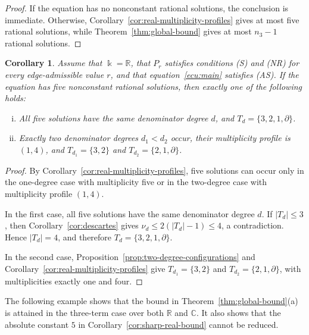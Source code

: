 \documentclass[12pt,a4paper]{amsart}
\numberwithin{theorem}{section}
\newtheorem{corollary}[theorem]{Corollary}
\theoremstyle{definition}
\begin{document}
	\begin{proof}
		If the equation has no nonconstant rational solutions, the conclusion is immediate. Otherwise, Corollary~\ref{cor:real-multiplicity-profiles} gives at most five rational solutions, while Theorem~\ref{thm:global-bound} gives at most $n_3-1$ rational solutions.
	\end{proof}
	
	\begin{corollary}\label{cor:five-solutions}
		Assume that $\Bbbk=\mathbb{R}$, that $P_r$ satisfies conditions {\rm (S)} and {\rm (NR)} for every edge-admissible value $r$, and that equation~\eqref{ecu:main} satisfies {\rm (AS)}. If the equation has five nonconstant rational solutions, then exactly one of the following holds:
		\begin{enumerate}[(i)]
			\item All five solutions have the same denominator degree $d$, and $T_d=\{3,2,1,\partial\}$.
			\item Exactly two denominator degrees $d_1<d_2$ occur, their multiplicity profile is $(1,4)$, and $T_{d_1}=\{3,2\}$ and $T_{d_2}=\{2,1,\partial\}$.
		\end{enumerate}
	\end{corollary}
	
	\begin{proof}
		By Corollary~\ref{cor:real-multiplicity-profiles}, five solutions can occur only in the one-degree case with multiplicity five or in the two-degree case with multiplicity profile $(1,4)$.
		
		In the first case, all five solutions have the same denominator degree $d$. If $|T_d|\leq3$, then Corollary~\ref{cor:descartes} gives $\nu_d\leq2(|T_d|-1)\leq4$, a contradiction. Hence $|T_d|=4$, and therefore $T_d=\{3,2,1,\partial\}$.
		
		In the second case, Proposition~\ref{prop:two-degree-configurations} and Corollary~\ref{cor:real-multiplicity-profiles} give $T_{d_1}=\{3,2\}$ and $T_{d_2}=\{2,1,\partial\}$, with multiplicities exactly one and four.
	\end{proof}
	
	The following example shows that the bound in Theorem~\ref{thm:global-bound}\textup{(a)} is attained in the three-term case over both $\mathbb{R}$ and $\mathbb{C}$. It also shows that the absolute constant $5$ in Corollary~\ref{cor:sharp-real-bound} cannot be reduced.
	
\end{document}
